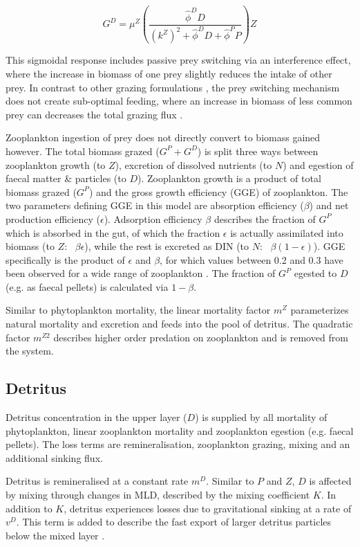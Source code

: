 \documentclass[template.tex]{subfiles}
\begin{document}
\begin{equation}
    G^D = \mu^Z \left( \frac{ \hat{\phi}^D D}{(k^Z)^2 + \hat{\phi}^D D +\hat{\phi}^P P}  \right) Z
\end{equation}

This sigmoidal response includes passive prey switching via an interference effect, where the increase in biomass of one prey slightly reduces the intake of other prey. In contrast to other grazing formulations \citep[e.g.][]{Fasham1990a}, the prey switching mechanism does not create sub-optimal feeding, where an increase in biomass of less common prey can decreases the total grazing flux \citep{Gentleman2003a}.

Zooplankton ingestion of prey does not directly convert to biomass gained however. The total biomass grazed ($G^P + G^D$) is split three ways between zooplankton growth (to $Z$), excretion of dissolved nutrients (to $N$) and egestion of faecal matter \& particles (to $D$). Zooplankton growth is a product of total biomass grazed ($G^P$) and the gross growth efficiency (GGE) of zooplankton. The two parameters defining GGE in this model are absorption efficiency ($\beta$) and net production efficiency ($\epsilon$). Adsorption efficiency $\beta$ describes the fraction of $G^P$ which is absorbed in the gut, of which the fraction $\epsilon$ is actually assimilated into biomass (to $Z$: \ $\beta \epsilon$), while the rest is excreted as DIN (to $N$: \ $\beta (1-\epsilon)$). GGE specifically is the product of $\epsilon$ and $\beta$, for which values between 0.2 and 0.3 have been observed for a wide range of zooplankton \citep{Straile1997GrossGroup}. The fraction of $G^P$ egested to $D$ (e.g. as faecal pellets) is calculated via $1-\beta$. 

Similar to phytoplankton mortality, the linear mortality factor $m^Z$ parameterizes natural mortality and excretion and feeds into the pool of detritus. The quadratic factor $m^{Z2}$ describes higher order predation on zooplankton and is removed from the system.

\subsection{Detritus}
Detritus concentration in the upper layer ($D$) is supplied by all mortality of phytoplankton, linear zooplankton mortality and zooplankton egestion (e.g. faecal pellets). The loss terms are remineralisation, zooplankton grazing, mixing and an additional sinking flux. 

Detritus is remineralised at a constant rate $m^D$. Similar to $P$ and $Z$, $D$ is affected by mixing through changes in MLD, described by the mixing coefficient $K$. In addition to $K$, detritus experiences losses due to gravitational sinking at a rate of $v^D$. This term is added to describe the fast export of larger detritus particles below the mixed layer \citep{Anderson2015c}.
\end{document}
